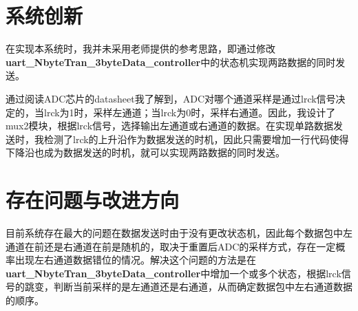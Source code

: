 \documentclass[UTF8]{ctexart}
\begin{document}
\FloatBarrier
\section{系统创新}
在实现本系统时，我并未采用老师提供的参考思路，即通过修改\textbf{uart\_NbyteTran\_3byteData\_controller}中的状态机实现两路数据的同时发送。

通过阅读ADC芯片的datasheet我了解到，ADC对哪个通道采样是通过lrck信号决定的，当lrck为1时，采样左通道；当lrck为0时，采样右通道。因此，我设计了mux2模块，根据lrck信号，选择输出左通道或右通道的数据。在实现单路数据发送时，我检测了lrck的上升沿作为数据发送的时机，因此只需要增加一行代码使得下降沿也成为数据发送的时机，就可以实现两路数据的同时发送。

\FloatBarrier
\section{存在问题与改进方向}
目前系统存在最大的问题在数据发送时由于没有更改状态机，因此每个数据包中左通道在前还是右通道在前是随机的，取决于重置后ADC的采样方式，存在一定概率出现左右通道数据错位的情况。解决这个问题的方法是在\textbf{uart\_NbyteTran\_3byteData\_controller}中增加一个或多个状态，根据lrck信号的跳变，判断当前采样的是左通道还是右通道，从而确定数据包中左右通道数据的顺序。
\end{document}
